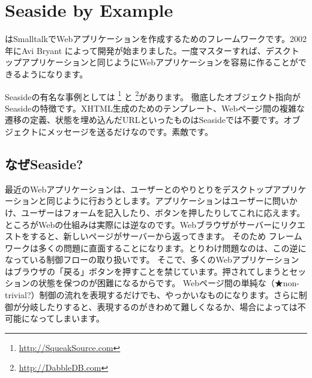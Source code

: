 \documentclass[a4paper,10pt,twoside]{book}
\begin{document}
	\sloppy
\fi
\chapter{Seaside by Example}


 はSmalltalkでWebアプリケーションを作成するためのフレームワークです。2002年にAvi Bryant  によって開発が始まりました。一度マスターすれば、デスクトップアプリケーションと同じようにWebアプリケーションを容易に作ることができるようになります。

Seasideの有名な事例としては \footnote{\url{http://SqueakSource.com}} と \footnote{\url{http://DabbleDB.com}}があります。
徹底したオブジェクト指向がSeasideの特徴です。XHTML生成のためのテンプレート、Webページ間の複雑な遷移の定義、状態を埋め込んだURLといったものはSeasideでは不要です。オブジェクトにメッセージを送るだけなのです。素敵です。

\section{なぜSeaside?}

最近のWebアプリケーションは、ユーザーとのやりとりをデスクトップアプリケーションと同じように行おうとします。アプリケーションはユーザーに問いかけ、ユーザーはフォームを記入したり、ボタンを押したりしてこれに応えます。
ところがWebの仕組みは実際には逆なのです。Webブラウザがサーバーにリクエストをすると、新しいページがサーバーから返ってきます。
そのため フレームワークは多くの問題に直面することになります。とりわけ問題なのは、この逆になっている制御フローの取り扱いです。
そこで、多くのWebアプリケーションはブラウザの「戻る」ボタンを押すことを禁じています。押されてしまうとセッションの状態を保つのが困難になるからです。
Webページ間の単純な（★non-trivial?）制御の流れを表現するだけでも、やっかいなものになります。さらに制御が分岐したりすると、表現するのがきわめて難しくなるか、場合によっては不可能になってしまいます。

\end{document}
